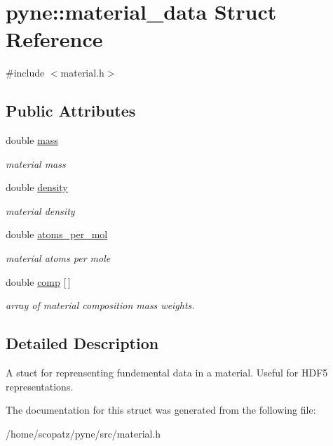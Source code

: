 \hypertarget{structpyne_1_1material__data}{\section{pyne\-:\-:material\-\_\-data Struct Reference}
\label{structpyne_1_1material__data}
}


{\ttfamily \#include $<$material.\-h$>$}

\subsection*{Public Attributes}
\begin{DoxyCompactItemize}
\item 
\hypertarget{structpyne_1_1material__data_a8e5fa2bf074f5c7770fcefca825640b9}{double \hyperlink{structpyne_1_1material__data_a8e5fa2bf074f5c7770fcefca825640b9}{mass}}\label{structpyne_1_1material__data_a8e5fa2bf074f5c7770fcefca825640b9}

\begin{DoxyCompactList}\small\item\em material mass \end{DoxyCompactList}\item 
\hypertarget{structpyne_1_1material__data_adf19d9e0612f5ea9c6093ad09c63eee4}{double \hyperlink{structpyne_1_1material__data_adf19d9e0612f5ea9c6093ad09c63eee4}{density}}\label{structpyne_1_1material__data_adf19d9e0612f5ea9c6093ad09c63eee4}

\begin{DoxyCompactList}\small\item\em material density \end{DoxyCompactList}\item 
\hypertarget{structpyne_1_1material__data_a135b69d35e0bc6c49a025a24cb153798}{double \hyperlink{structpyne_1_1material__data_a135b69d35e0bc6c49a025a24cb153798}{atoms\-\_\-per\-\_\-mol}}\label{structpyne_1_1material__data_a135b69d35e0bc6c49a025a24cb153798}

\begin{DoxyCompactList}\small\item\em material atoms per mole \end{DoxyCompactList}\item 
\hypertarget{structpyne_1_1material__data_a5fc15bdb605f1bcfc07bf0e84fd98289}{double \hyperlink{structpyne_1_1material__data_a5fc15bdb605f1bcfc07bf0e84fd98289}{comp} \mbox{[}$\,$\mbox{]}}\label{structpyne_1_1material__data_a5fc15bdb605f1bcfc07bf0e84fd98289}

\begin{DoxyCompactList}\small\item\em array of material composition mass weights. \end{DoxyCompactList}\end{DoxyCompactItemize}


\subsection{Detailed Description}
A stuct for reprensenting fundemental data in a material. Useful for H\-D\-F5 representations. 

The documentation for this struct was generated from the following file\-:\begin{DoxyCompactItemize}
\item 
/home/scopatz/pyne/src/material.\-h\end{DoxyCompactItemize}
